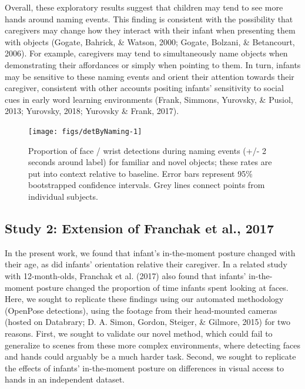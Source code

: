 \documentclass[english,man]{apa6}
\begin{document}
Overall, these exploratory results suggest that children may tend to see
more hands around naming events. This finding is consistent with the
possibility that caregivers may change how they interact with their
infant when presenting them with objects (Gogate, Bahrick, \& Watson,
2000; Gogate, Bolzani, \& Betancourt, 2006). For example, caregivers may
tend to simultaneously name objects when demonstrating their affordances
or simply when pointing to them. In turn, infants may be sensitive to
these naming events and orient their attention towards their caregiver,
consistent with other accounts positing infants' sensitivity to social
cues in early word learning environments (Frank, Simmons, Yurovsky, \&
Pusiol, 2013; Yurovsky, 2018; Yurovsky \& Frank, 2017).

\begin{figure}[H]

{\centering \texttt{[image: figs/detByNaming-1]} 

}

\caption{Proportion of face / wrist detections during naming events (+/- 2 seconds around label) for familiar and novel objects; these rates are put into context relative to baseline. Error bars represent 95\% bootstrapped confidence intervals. Grey lines connect points from individual subjects.}\label{fig:detByNaming}
\end{figure}

\subsection{Study 2: Extension of Franchak et al.,
2017}\label{study-2-extension-of-franchak-et-al.-2017}

In the present work, we found that infant's in-the-moment posture
changed with their age, as did infants' orientation relative their
caregiver. In a related study with 12-month-olds, Franchak et al. (2017)
also found that infants' in-the-moment posture changed the proportion of
time infants spent looking at faces. Here, we sought to replicate these
findings using our automated methodology (OpenPose detections), using
the footage from their head-mounted cameras (hosted on Databrary; D. A.
Simon, Gordon, Steiger, \& Gilmore, 2015) for two reasons. First, we
sought to validate our novel method, which could fail to generalize to
scenes from these more complex environments, where detecting faces and
hands could arguably be a much harder task. Second, we sought to
replicate the effects of infants' in-the-moment posture on differences
in visual access to hands in an independent dataset.
\end{document}
